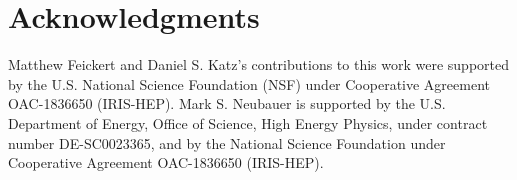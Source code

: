 \section*{Acknowledgments}\label{sec:acknowledgments}
Matthew Feickert and Daniel S. Katz's contributions to this work were supported by the U.S. National Science Foundation (NSF) under Cooperative Agreement OAC-1836650 (IRIS-HEP).
Mark S. Neubauer is supported by the U.S. Department of Energy, Office of Science, High Energy Physics, under contract number DE-SC0023365, and by the National Science Foundation under Cooperative Agreement OAC-1836650 (IRIS-HEP).
